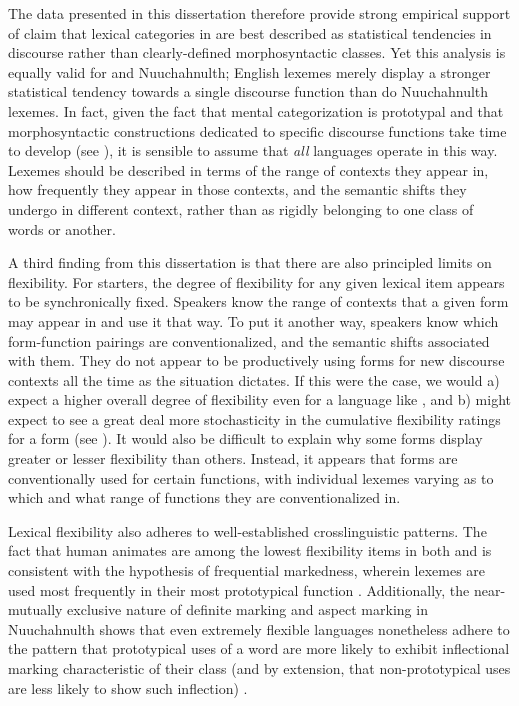 The data presented in this dissertation therefore provide strong empirical support of  claim that lexical categories in  are best described as statistical tendencies in discourse rather than clearly-defined morphosyntactic classes. Yet this analysis is equally valid for  and Nuuchahnulth; English lexemes merely display a stronger statistical tendency towards a single discourse function than do Nuuchahnulth lexemes. In fact, given the fact that mental categorization is prototypal and that morphosyntactic constructions dedicated to specific discourse functions take time to develop (see ), it is sensible to assume that \emph{all} languages operate in this way. Lexemes should be described in terms of the range of contexts they appear in, how frequently they appear in those contexts, and the semantic shifts they undergo in different context, rather than as rigidly belonging to one class of words or another.

A third finding from this dissertation is that there are also principled limits on flexibility. For starters, the degree of flexibility for any given lexical item appears to be synchronically fixed. Speakers know the range of contexts that a given form may appear in and use it that way. To put it another way, speakers know which form-function pairings are conventionalized, and the semantic shifts associated with them. They do not appear to be productively using forms for new discourse contexts all the time as the situation dictates. If this were the case, we would a) expect a higher overall degree of flexibility even for a language like , and b) might expect to see a great deal more stochasticity in the cumulative flexibility ratings for a form (see ). It would also be difficult to explain why some forms display greater or lesser flexibility than others. Instead, it appears that forms are conventionally used for certain functions, with individual lexemes varying as to which and what range of functions they are conventionalized in.

Lexical flexibility also adheres to well-established crosslinguistic patterns. The fact that human animates are among the lowest flexibility items in both  and  is consistent with the hypothesis of frequential markedness, wherein lexemes are used most frequently in their most prototypical function \parencites{Croft1991}{Croft2000}{Croft2001b}{CroftLier2012}. Additionally, the near-mutually exclusive nature of definite marking and aspect marking in Nuuchahnulth shows that even extremely flexible languages nonetheless adhere to the pattern that prototypical uses of a word are more likely to exhibit inflectional marking characteristic of their class (and by extension, that non-prototypical uses are less likely to show such inflection) \parencite{HopperThompson1984}.

